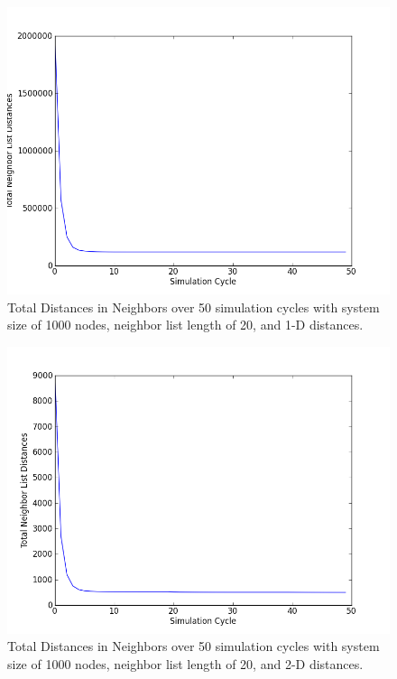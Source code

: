 \documentclass{article}
\begin{document}
  \begin{figure}[h]
    \centering
    \includegraphics[width=1\textwidth]{simData1D.png}
    \caption{Total Distances in Neighbors over 50 simulation cycles with system
    size of 1000 nodes, neighbor list length of 20, and 1-D distances.}
    \label{results1}
  \end{figure}

  \begin{figure}[h]
    \centering
    \includegraphics[width=1\textwidth]{simData2D.png}
    \caption{Total Distances in Neighbors over 50 simulation cycles with system
    size of 1000 nodes, neighbor list length of 20, and 2-D distances.}
    \label{results2}
  \end{figure}

\newpage


\end{document}
